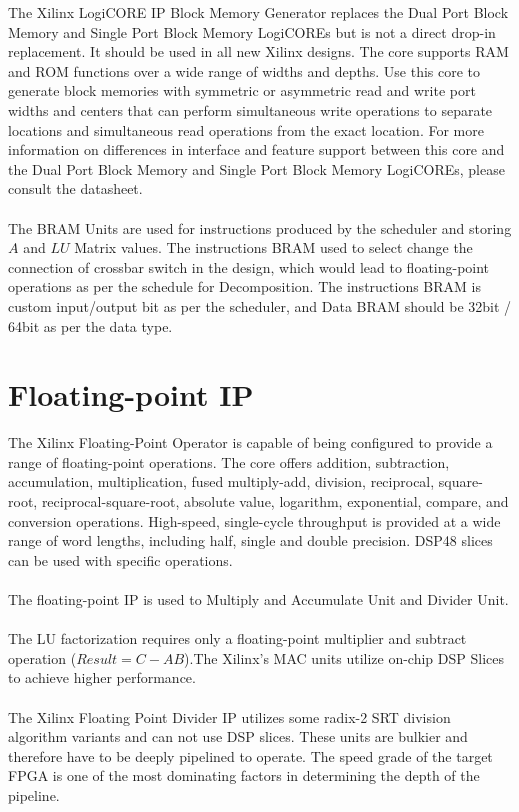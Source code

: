 The Xilinx LogiCORE IP Block Memory Generator replaces the Dual Port Block Memory and Single Port Block Memory LogiCOREs but is not a direct drop-in replacement. It should be used in all new Xilinx designs. The core supports RAM and ROM functions over a wide range of widths and depths. Use this core to generate block memories with symmetric or asymmetric read and write port widths and centers that can perform simultaneous write operations to separate locations and simultaneous read operations from the exact location. For more information on differences in interface and feature support between this core and the Dual Port Block Memory and Single Port Block Memory LogiCOREs, please consult the datasheet.
\\
\\
The BRAM Units are used for instructions produced by the scheduler and storing $A$ and $LU$ Matrix values. The instructions BRAM used to select change the connection of crossbar switch in the design, which would lead to floating-point operations as per the schedule for Decomposition. The instructions BRAM is custom input/output bit as per the scheduler, and Data BRAM should be 32bit / 64bit as per the data type.

\section{Floating-point IP}
The Xilinx Floating-Point Operator is capable of being configured to provide a range of floating-point operations. The core offers addition, subtraction, accumulation, multiplication, fused multiply-add, division, reciprocal, square-root, reciprocal-square-root, absolute value, logarithm, exponential, compare, and conversion operations. High-speed, single-cycle throughput is provided at a wide range of word lengths, including half, single and double precision. DSP48 slices can be used with specific operations.
\\
\\
The floating-point IP is used to Multiply and Accumulate Unit and Divider Unit.
\\
\\
The LU factorization requires only a floating-point multiplier and subtract operation ($Result = C - AB$).The Xilinx's MAC units utilize on-chip DSP Slices to achieve higher performance.
\\
\\
The Xilinx Floating Point Divider IP utilizes some radix-2 SRT division algorithm variants and can not use DSP slices. These units are bulkier and therefore have to be deeply pipelined to operate. The speed grade of the target FPGA is one of the most dominating factors in determining the depth of the pipeline.


